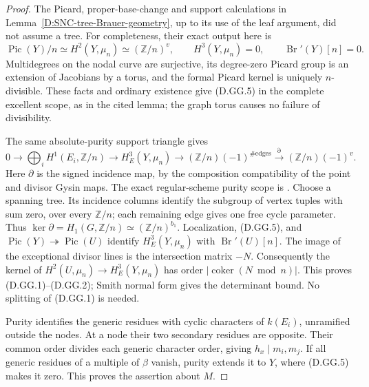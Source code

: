 \begin{proof}
The Picard, proper-base-change and support calculations
in Lemma~\ref{D:SNC-tree-Brauer-geometry}, up to its
use of the leaf argument, did not assume a tree.
For completeness, their exact output here is
\[
 \operatorname{Pic}(Y)/n\simeq H^2(Y,\mu_n)
       \simeq(\mathbb Z/n)^v,\qquad H^3(Y,\mu_n)=0,
 \qquad\operatorname{Br}'(Y)[n]=0.                    \tag{D.GG.5}
\]
Multidegrees on the nodal curve are surjective, its
degree-zero Picard group is an extension of Jacobians
by a torus, and the formal Picard kernel is uniquely
\(n\)-divisible. These facts and ordinary existence
give (D.GG.5) in the complete excellent scope, as in
the cited lemma; the graph torus causes no failure
of divisibility.

The same absolute-purity support triangle gives
\[
 0\to\bigoplus_iH^1(E_i,\mathbb Z/n)
 \to H^3_E(Y,\mu_n)\to(\mathbb Z/n)(-1)^{\#\mathrm{edges}}
 \xrightarrow{\partial}(\mathbb Z/n)(-1)^v.           \tag{D.GG.6}
\]
Here \(\partial\) is the signed incidence map, by the
composition compatibility of the point and divisor
Gysin maps. The exact regular-scheme purity scope is
\citet[Expose XVI, Sections2--3, Theorem3.1.1 and the
complete proof of Corollary3.1.3]{A_ILO2014}.
Choose a spanning tree. Its incidence columns identify
the subgroup of vertex tuples with sum zero, over
every \(\mathbb Z/n\); each remaining edge gives one
free cycle parameter. Thus
\(\ker\partial=H_1(G,\mathbb Z/n)\simeq(\mathbb Z/n)^{b_1}\).
Localization, (D.GG.5), and
\(\operatorname{Pic}(Y)\twoheadrightarrow\operatorname{Pic}(U)\)
identify \(H^3_E(Y,\mu_n)\) with
\(\operatorname{Br}'(U)[n]\). The image of the exceptional
divisor lines is the intersection matrix \(-N\).
Consequently the kernel of \(H^2(U,\mu_n)\to H^3_E(Y,\mu_n)\)
has order \(|\operatorname{coker}(N\bmod n)|\).
This proves (D.GG.1)--(D.GG.2); Smith normal form gives
the determinant bound. No splitting of (D.GG.1) is needed.

Purity identifies the generic residues with cyclic
characters of \(k(E_i)\), unramified outside the nodes.
At a node their two secondary residues are opposite.
Their common order divides each generic character order,
giving \(h_x\mid m_i,m_j\). If all generic residues of
a multiple of \(\beta\) vanish, purity extends it to
\(Y\), where (D.GG.5) makes it zero. This proves the
assertion about \(M\).


\end{proof}
